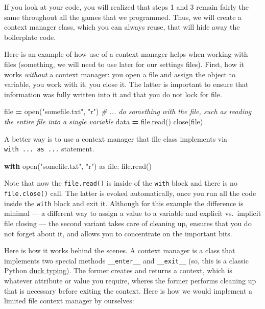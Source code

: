 \documentclass[
]{book}
\newenvironment{Shaded}{\begin{snugshade}}{\end{snugshade}}
\newcommand{\BuiltInTok}[1]{#1}
\newcommand{\CommentTok}[1]{\textcolor[rgb]{0.56,0.35,0.01}{\textit{#1}}}
\newcommand{\ControlFlowTok}[1]{\textcolor[rgb]{0.13,0.29,0.53}{\textbf{#1}}}
\newcommand{\ImportTok}[1]{#1}
\newcommand{\NormalTok}[1]{#1}
\newcommand{\OperatorTok}[1]{\textcolor[rgb]{0.81,0.36,0.00}{\textbf{#1}}}
\newcommand{\StringTok}[1]{\textcolor[rgb]{0.31,0.60,0.02}{#1}}
\begin{document}
If you look at your code, you will realized that steps 1 and 3 remain fairly the same throughout all the games that we programmed. Thus, we will create a context manager class, which you can always reuse, that will hide away the boilerplate code.

Here is an example of how use of a context manager helps when working with files (something, we will need to use later for our settings files). First, how it works \emph{without} a context manager: you open a file and assign the object to variable, you work with it, you close it. The latter is important to ensure that information was fully written into it and that you do not lock for file.

\begin{Shaded}
\begin{Highlighting}[]
\BuiltInTok{file} \OperatorTok{=} \BuiltInTok{open}\NormalTok{(}\StringTok{"somefile.txt"}\NormalTok{, }\StringTok{"r"}\NormalTok{)}
\CommentTok{\# ... do something with the file, such as reading the entire file into a single variable}
\NormalTok{data }\OperatorTok{=} \BuiltInTok{file}\NormalTok{.read()}
\NormalTok{close(}\BuiltInTok{file}\NormalTok{)}
\end{Highlighting}
\end{Shaded}

A better way is to use a context manager that file class implements via \texttt{with\ ...\ as\ ...} statement.

\begin{Shaded}
\begin{Highlighting}[]
\ControlFlowTok{with} \BuiltInTok{open}\NormalTok{(}\StringTok{"somefile.txt"}\NormalTok{, }\StringTok{"r"}\NormalTok{) }\ImportTok{as} \BuiltInTok{file}\NormalTok{:}
    \BuiltInTok{file}\NormalTok{.read()}
\end{Highlighting}
\end{Shaded}

Note that now the \texttt{file.read()} is inside of the \texttt{with} block and there is no \texttt{file.close()} call. The latter is evoked automatically, once you run all the code inside the \texttt{with} block and exit it. Although for this example the difference is minimal --- a different way to assign a value to a variable and explicit vs.~implicit file closing --- the second variant takes care of cleaning up, ensures that you do not forget about it, and allows you to concentrate on the important bits.

Here is how it works behind the scenes. A context manager is a class that implements two special methods \texttt{\_\_enter\_\_} and \texttt{\_\_exit\_\_} (so, this is a classic Python \href{duck-typing}{duck typing}). The former creates and returns a context, which is whatever attribute or value you require, wheres the former performs cleaning up that is necessary before exiting the context. Here is how we would implement a limited file context manager by ourselves:
\end{document}

